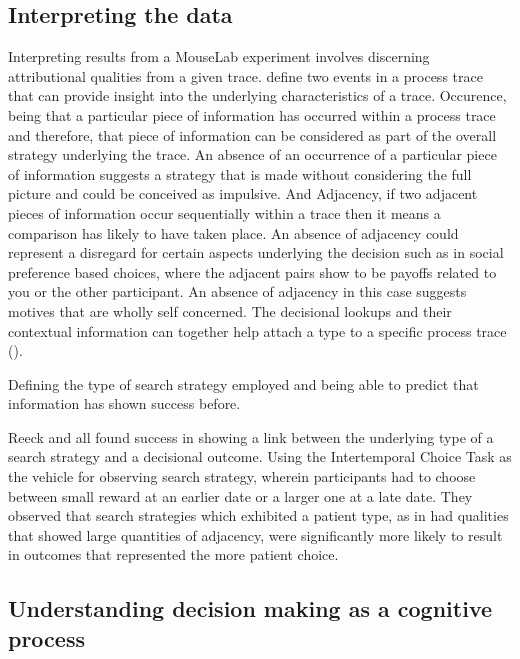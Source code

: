 \documentclass[man, floatsintext]{apa7}
\begin{document}
\subsection{Interpreting the data}

Interpreting results from a MouseLab experiment involves discerning attributional qualities from a given trace. \citeauthor{costa-gomesCognitionBehaviorNormalForm2001} define two events in a process trace that can provide insight into the underlying characteristics of a trace. Occurence, being that a particular piece of information has occurred within a process trace and therefore, that piece of information can be considered as part of the overall strategy underlying the trace. An absence of an occurrence of a particular piece of information suggests a strategy that is made without considering the full picture and could be conceived as impulsive. And Adjacency, if two adjacent pieces of information occur sequentially within a trace then it means a comparison has likely to have taken place. An absence of adjacency could represent a disregard for certain aspects underlying the decision such as in social preference based choices, where the adjacent pairs show to be payoffs related to you or the other participant. An absence of adjacency in this case suggests motives that are wholly self concerned. The decisional lookups and their contextual information can together help attach a type to a specific process trace (\cite{costa-gomesCognitionBehaviorNormalForm2001}).




Defining the type of search strategy employed and being able to predict that information has shown success before.

Reeck and all found success in showing a link between the underlying type of a search strategy and a decisional outcome. Using the Intertemporal Choice Task as the vehicle for observing search strategy, wherein participants had to choose between small reward at an earlier date or a larger one at a late date. They observed that search strategies which exhibited a patient type, as in had qualities that showed large quantities of adjacency, were significantly more likely to result in outcomes that represented the more patient choice. 

\subsection{Understanding decision making as a cognitive process}
\end{document}
